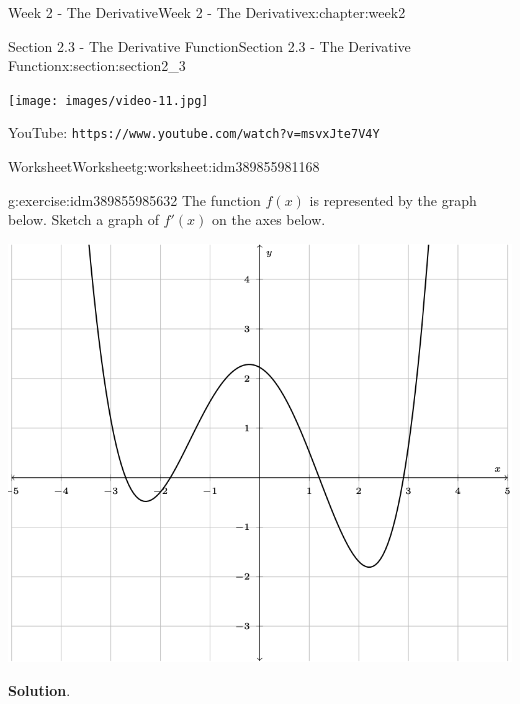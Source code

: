 \documentclass[oneside,10pt,]{book}
\newcommand{\blocktitlefont}{\relax}
\newcommand{\mono}[1]{\texttt{#1}}
\numberwithin{equation}{section}
\newlength{\qrsize}
\newlength{\previewwidth}
\begin{document}
\begin{chapterptx}{Week 2 - The Derivative}{}{Week 2 - The Derivative}{}{}{x:chapter:week2}
\begin{sectionptx}{Section 2.3 - The Derivative Function}{}{Section 2.3 - The Derivative Function}{}{}{x:section:section2_3}
\begin{tcbraster}[raster columns=2, raster column skip=1pt, raster halign=center, raster force size=false, raster left skip=0pt, raster right skip=0pt]
\begin{tcolorbox}[previewstyle, width=\previewwidth]%
\texttt{[image: images/video-11.jpg]}%
\end{tcolorbox}%
\begin{tcolorbox}[qrstyle]%
{\hypersetup{urlcolor=black}}%
\end{tcolorbox}%
\begin{tcolorbox}[captionstyle]%
\small YouTube: \mono{https://www.youtube.com/watch?v=msvxJte7V4Y}\end{tcolorbox}%
\end{tcbraster}%
%
%
\typeout{************************************************}
\typeout{************************************************}
%
\begin{worksheet-subsection}{Worksheet}{}{Worksheet}{}{}{g:worksheet:idm389855981168}
\begin{divisionexercise}{1}{}{}{g:exercise:idm389855985632}%
The function \(f(x)\) is represented by the graph below. Sketch a graph of \(f'(x)\) on the axes below. \begin{image}{0}{1}{0}%
\includegraphics[width=\linewidth]{images/Math140WkshtDerivative2G1.png}
\end{image}%
%
\textbf{\blocktitlefont Solution}.\hypertarget{g:solution:idm389855999760}{}\quad{}\begin{image}{0}{1}{0}%

\end{image}
\end{divisionexercise}
\end{worksheet-subsection}
\end{sectionptx}
\end{chapterptx}
\end{document}
